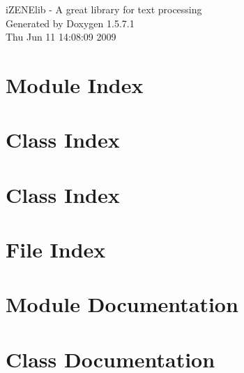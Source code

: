 \documentclass[a4paper]{book}
\begin{document}
\begin{titlepage}
\vspace*{7cm}
\begin{center}
{\Large iZENElib - A great library for text processing }\\
\vspace*{1cm}
{\large Generated by Doxygen 1.5.7.1}\\
\vspace*{0.5cm}
{\small Thu Jun 11 14:08:09 2009}\\
\end{center}
\end{titlepage}
\clearemptydoublepage
{}
\tableofcontents
\clearemptydoublepage
{}
\chapter{Module Index}

\chapter{Class Index}

\chapter{Class Index}

\chapter{File Index}

\chapter{Module Documentation}


\chapter{Class Documentation}










































\end{document}
